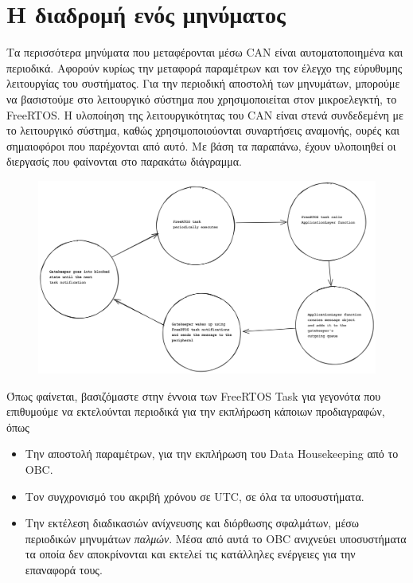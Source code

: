 \documentclass[a4paper,nobib,justified]{tufte-book}
\begin{document}

\section{Η διαδρομή ενός μηνύματος}

Τα περισσότερα μηνύματα που μεταφέρονται μέσω CAN είναι αυτοματοποιημένα και περιοδικά. Αφορούν κυρίως την μεταφορά παραμέτρων και τον έλεγχο της εύρυθυμης λειτουργίας του συστήματος. Για την περιοδική αποστολή των μηνυμάτων, μπορούμε να βασιστούμε στο λειτουργικό σύστημα που χρησιμοποιείται στον μικροελεγκτή, το FreeRTOS. Η υλοποίηση της λειτουργικότητας του CAN είναι στενά συνδεδεμένη με το λειτουργικό σύστημα, καθώς χρησιμοποιούονται συναρτήσεις αναμονής, ουρές και σημαιοφόροι που παρέχονται από αυτό. Με βάση τα παραπάνω, έχουν υλοποιηθεί οι διεργασίς που φαίνονται στο παρακάτω διάγραμμα.

\begin{figure}[h]
	\includegraphics[width=0.8\pdfpagewidth]{media/diagrams/message-send-fsm.png}
\end{figure}

Όπως φαίνεται, βασιζόμαστε στην έννοια των FreeRTOS Task για γεγονότα που επιθυμούμε να εκτελούνται περιοδικά για την εκπλήρωση κάποιων προδιαγραφών, όπως
\begin{itemize}
	\item Την αποστολή παραμέτρων, για την εκπλήρωση του Data Housekeeping από το OBC.
	\item Τον συγχρονισμό του ακριβή χρόνου σε UTC, σε όλα τα υποσυστήματα.
	\item Την εκτέλεση διαδικασιών ανίχνευσης και διόρθωσης σφαλμάτων, μέσω περιοδικών μηνυμάτων \emph{παλμών}. Μέσα από αυτά το OBC ανιχνεύει υποσυστήματα τα οποία δεν αποκρίνονται και εκτελεί τις κατάλληλες ενέργειες για την επαναφορά τους. 
\end{itemize}
\end{document}
